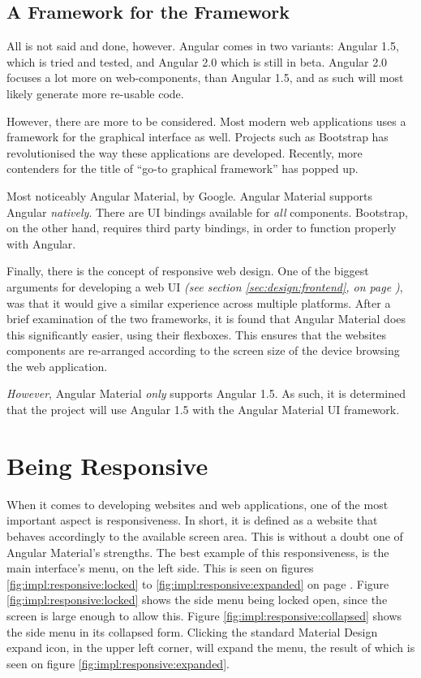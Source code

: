 		\subsection{A Framework for the Framework}
			All is not said and done, however. Angular comes in two variants: Angular 1.5, which is tried and tested, and Angular 2.0 which is still in beta. Angular 2.0 focuses a lot more on web-components, than Angular 1.5, and as such will most likely generate more re-usable code. 

			However, there are more to be considered. Most modern web applications uses a framework for the graphical interface as well. Projects such as Bootstrap has revolutionised the way these applications are developed. Recently, more contenders for the title of ``go-to graphical framework'' has popped up.

			Most noticeably Angular Material, by Google. Angular Material supports Angular \emph{natively}. There are UI bindings available for \emph{all} components. Bootstrap, on the other hand, requires third party bindings, in order to function properly with Angular.

			Finally, there is the concept of responsive web design. One of the biggest arguments for developing a web UI \emph{(see section \ref{sec:design:frontend}, on page \pageref{sec:design:frontend})}, was that it would give a similar experience across multiple platforms. After a brief examination of the two frameworks, it is found that Angular Material does this significantly easier, using their flexboxes. This ensures that the websites components are re-arranged according to the screen size of the device browsing the web application.

			\emph{However}, Angular Material \emph{only} supports Angular 1.5. As such, it is determined that the project will use Angular 1.5 with the Angular Material UI framework.

	\section{Being Responsive}
		When it comes to developing websites and web applications, one of the most important aspect is responsiveness. In short, it is defined as a website that behaves accordingly to the available screen area. This is without a doubt one of Angular Material's strengths. The best example of this responsiveness, is the main interface's menu, on the left side. This is seen on figures \ref{fig:impl:responsive:locked} to \ref{fig:impl:responsive:expanded} on page \pageref{fig:impl:responsive:locked}. Figure \ref{fig:impl:responsive:locked} shows the side menu being locked open, since the screen is large enough to allow this. Figure \ref{fig:impl:responsive:collapsed} shows the side menu in its collapsed form. Clicking the standard Material Design expand icon, in the upper left corner, will expand the menu, the result of which is seen on figure \ref{fig:impl:responsive:expanded}.

